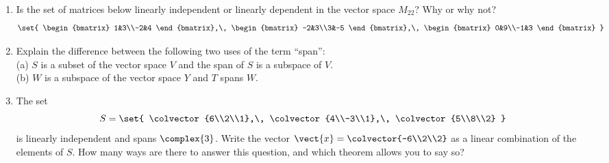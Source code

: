 \begin{enumerate}
%
\item Is the set of matrices below linearly independent or linearly dependent in the vector space $M_{22}$?  Why or why not?
%
\begin{equation*}
\set{
\begin{bmatrix}
1&3\\-2&4
\end{bmatrix},\,
\begin{bmatrix}
-2&3\\3&-5
\end{bmatrix},\,
\begin{bmatrix}
0&9\\-1&3
\end{bmatrix}
}
\end{equation*}
%
\item Explain the difference between the following two uses of the term ``span'':\\
(a) $S$ is a subset of the vector space $V$ and the span of $S$ is a subspace of $V$.\\
(b) $W$ is a subspace of the vector space $Y$ and $T$ spans $W$.
%
\item The set
%
\begin{equation*}
S=\set{
\colvector{6\\2\\1},\,
\colvector{4\\-3\\1},\,
\colvector{5\\8\\2}
}
\end{equation*}
%
is linearly independent and spans $\complex{3}$.  Write the vector
$\vect{x}=\colvector{-6\\2\\2}$ as a linear combination of the elements of $S$.  How many ways are there to answer this question, and which theorem allows you to say so?
%
\end{enumerate}